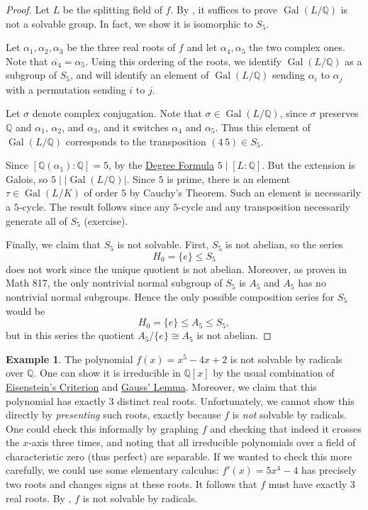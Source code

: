 \documentclass[12pt]{report}
\numberwithin{equation}{section}
\numberwithin{theorem}{chapter}
\theoremstyle{definition}
\newtheorem{example}[theorem]{Example}
\newtheorem*{basic properties}{Basic Properties}
\newtheorem*{Important Remark}{Important Remark}
\DeclareMathOperator{\Gal}{Gal}
\begin{document}
\begin{proof} 
Let $L$ be the splitting field of $f$. By , it suffices to prove $\Gal(L/\mathbb{Q})$ is not a solvable group. In fact, we show it is isomorphic to $S_5$.

Let $\alpha_1, \alpha_2, \alpha_3$ be the three real roots of $f$ and let $\alpha_4, \alpha_5$ the two complex ones.
Note that $\overline{\alpha_4} = \alpha_5$.  Using this ordering of the roots, we identify $\Gal(L/\mathbb{Q})$ as a subgroup of $S_5$, and will identify an element of $\Gal(L/\mathbb{Q})$ sending $\alpha_i$ to $\alpha_j$ with a permutation sending $i$ to $j$.

Let $\sigma$ denote complex conjugation. Note that $\sigma \in \Gal(L/\mathbb{Q})$, since $\sigma$ preserves $\mathbb{Q}$ and $\alpha_1$, $\alpha_2$, and $\alpha_3$, and it switches $\alpha_4$ and $\alpha_5$. Thus this element of $\Gal(L/\mathbb{Q})$ corresponds to the transposition $(4 \, 5) \in S_5$.


Since $[\mathbb{Q}(\alpha_1): \mathbb{Q}] = 5$, by the \hyperref[deg formula]{Degree Formula} $5 \mid [L : \mathbb{Q}]$. But the extension is Galois, so $5 \mid |\Gal(L/\mathbb{Q})|$. Since $5$ is prime, there is an element $\tau \in \Gal(L/K)$ of order $5$ by Cauchy's Theorem. Such an element is necessarily a $5$-cycle. The result follows since any $5$-cycle and any transposition necessarily generate all of $S_5$ (exercise).

Finally, we claim that $S_5$ is not solvable. First, $S_5$ is not abelian, so the series 
$$H_0=\{e\}\leq S_5$$
does not work since the unique quotient is not abelian. 
Moreover, as proven in Math 817, the only nontrivial normal subgroup of $S_5$ is $A_5$ and $A_5$ has no nontrivial normal subgroups. Hence the only possible composition series for $S_5$ would be 
$$H_0=\{e\}\leq A_5\leq S_5,$$ 
but in this series the quotient $A_5/\{e\}\cong A_5$ is not abelian.
\end{proof}

\begin{example} 
The polynomial $f(x) = x^5 - 4x + 2$ is not solvable by radicals over $\mathbb{Q}$.
One can show it is irreducible in $\mathbb{Q}[x]$ by the usual combination of \hyperref[eisenstein criterion]{Eisenstein's Criterion} and \hyperref[Gauss Lemma]{Gauss' Lemma}. Moreover, we claim that this polynomial has exactly $3$ distinct real roots. Unfortunately, we cannot show this directly by \emph{presenting} such roots, exactly because $f$ is \emph{not} solvable by radicals. One could check this informally by graphing $f$ and checking that indeed it crosses the $x$-axis three times, and noting that all irreducible polynomials over a field of characteristic zero (thus perfect) are separable. If we wanted to check this more carefully, we could use some elementary calculus: $f'(x) = 5x^4 - 4$ has precisely two roots and changes signs at these roots. It follows that $f$ must have exactly $3$ real roots. By , $f$ is not solvable by radicals.
\end{example}
\end{document}
